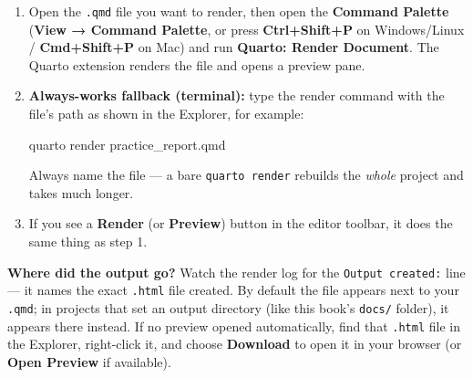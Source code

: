 \documentclass[
  letterpaper,
  DIV=11,
  numbers=noendperiod,
  oneside]{scrreprt}
\newenvironment{Shaded}{\begin{snugshade}}{\end{snugshade}}
\newcommand{\ExtensionTok}[1]{\textcolor[rgb]{0.00,0.23,0.31}{#1}}
\newcommand{\NormalTok}[1]{\textcolor[rgb]{0.00,0.23,0.31}{#1}}
\begin{document}
\begin{tcolorbox}[enhanced jigsaw, title=\textcolor{quarto-callout-tip-color}{\faLightbulb}\hspace{0.5em}{How to render: the course default}, arc=.35mm, toptitle=1mm, colframe=quarto-callout-tip-color-frame, toprule=.15mm, leftrule=.75mm, bottomtitle=1mm, opacityback=0, bottomrule=.15mm, coltitle=black, breakable, opacitybacktitle=0.6, titlerule=0mm, colback=white, left=2mm, colbacktitle=quarto-callout-tip-color!10!white, rightrule=.15mm]

\begin{enumerate}
\def\labelenumi{\arabic{enumi}.}
\item
  Open the \texttt{.qmd} file you want to render, then open the
  \textbf{Command Palette} (\textbf{View → Command Palette}, or press
  \textbf{Ctrl+Shift+P} on Windows/Linux / \textbf{Cmd+Shift+P} on Mac)
  and run \textbf{Quarto: Render Document}. The Quarto extension renders
  the file and opens a preview pane.
\item
  \textbf{Always-works fallback (terminal):} type the render command
  with the file's path as shown in the Explorer, for example:

\begin{Shaded}
\begin{Highlighting}[numbers=left,,]
\ExtensionTok{quarto}\NormalTok{ render practice\_report.qmd}
\end{Highlighting}
\end{Shaded}

  Always name the file --- a bare \texttt{quarto\ render} rebuilds the
  \emph{whole} project and takes much longer.
\item
  If you see a \textbf{Render} (or \textbf{Preview}) button in the
  editor toolbar, it does the same thing as step 1.
\end{enumerate}

\textbf{Where did the output go?} Watch the render log for the
\texttt{Output\ created:} line --- it names the exact \texttt{.html}
file created. By default the file appears next to your \texttt{.qmd}; in
projects that set an output directory (like this book's \texttt{docs/}
folder), it appears there instead. If no preview opened automatically,
find that \texttt{.html} file in the Explorer, right-click it, and
choose \textbf{Download} to open it in your browser (or \textbf{Open
Preview} if available).

\end{tcolorbox}
\end{document}
